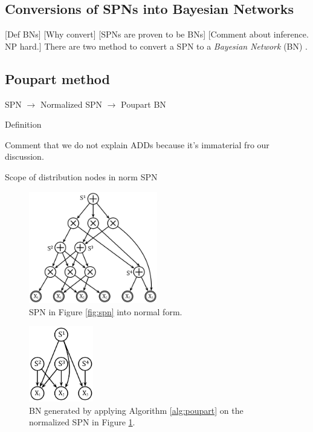 \subsection{Conversions of SPNs into Bayesian Networks}

[Def BNs]
[Why convert]
[SPNs are proven to be BNs]
[Comment about inference. NP hard.]
There are two method to convert a SPN to a \emph{Bayesian Network} (BN) \cite{pear88}.

\subsection{Poupart method}

SPN $\rightarrow$ Normalized SPN $\rightarrow$ Poupart BN

Definition

Comment that we do not explain ADDs because it's immaterial fro our discussion. 

Scope of distribution nodes in norm SPN

\begin{figure}[h]
    \begin{center}
		\includegraphics[width=0.5\textwidth]{figures/norm_SPN.png}
		\caption{SPN in Figure \ref{fig:spn} into normal form.}
	\label{fig:norm_spn}
    \end{center}
\end{figure}

\begin{figure}[h]
    \begin{center}
		\includegraphics[width=0.25\textwidth]{figures/bn_poupart.png}
		\caption{BN generated by applying Algorithm \ref{alg:poupart} on the normalized SPN in Figure \ref{fig:norm_spn}.}
	\label{fig:bn_poupart}
    \end{center}
\end{figure}

